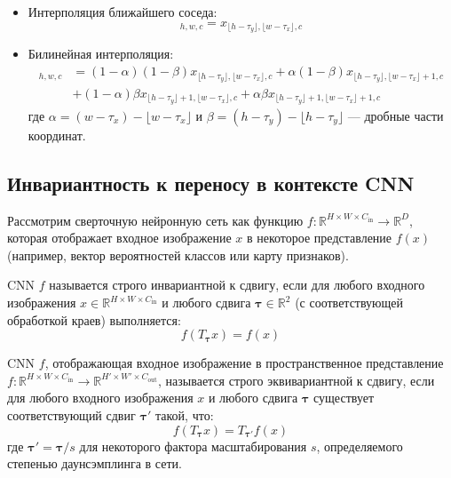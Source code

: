 \begin{itemize}
    \item Интерполяция ближайшего соседа:
    \begin{equation}
    [T_{\boldsymbol{\tau}}x]_{h,w,c} = x_{\lfloor h-\tau_y \rfloor, \lfloor w-\tau_x \rfloor, c}
    \end{equation}
    
    \item Билинейная интерполяция:
    \begin{align}
    [T_{\boldsymbol{\tau}}x]_{h,w,c} &= (1-\alpha)(1-\beta)x_{\lfloor h-\tau_y \rfloor, \lfloor w-\tau_x \rfloor, c} + \alpha(1-\beta)x_{\lfloor h-\tau_y \rfloor, \lfloor w-\tau_x \rfloor+1, c} \nonumber \\
    &+ (1-\alpha)\beta x_{\lfloor h-\tau_y \rfloor+1, \lfloor w-\tau_x \rfloor, c} + \alpha\beta x_{\lfloor h-\tau_y \rfloor+1, \lfloor w-\tau_x \rfloor+1, c}
    \end{align}
    где $\alpha = (w-\tau_x) - \lfloor w-\tau_x \rfloor$ и $\beta = (h-\tau_y) - \lfloor h-\tau_y \rfloor$ — дробные части координат.
\end{itemize}

\subsection{Инвариантность к переносу в контексте CNN}
\label{theory:formal_definition:cnn_context}

Рассмотрим сверточную нейронную сеть как функцию $f: \mathbb{R}^{H \times W \times C_{\text{in}}} \rightarrow \mathbb{R}^{D}$, которая отображает входное изображение $x$ в некоторое представление $f(x)$ (например, вектор вероятностей классов или карту признаков).

\begin{definition}
CNN $f$ называется строго инвариантной к сдвигу, если для любого входного изображения $x \in \mathbb{R}^{H \times W \times C_{\text{in}}}$ и любого сдвига $\boldsymbol{\tau} \in \mathbb{R}^2$ (с соответствующей обработкой краев) выполняется:
\begin{equation}
f(T_{\boldsymbol{\tau}}x) = f(x)
\end{equation}
\end{definition}

\begin{definition}
CNN $f$, отображающая входное изображение в пространственное представление $f: \mathbb{R}^{H \times W \times C_{\text{in}}} \rightarrow \mathbb{R}^{H' \times W' \times C_{\text{out}}}$, называется строго эквивариантной к сдвигу, если для любого входного изображения $x$ и любого сдвига $\boldsymbol{\tau}$ существует соответствующий сдвиг $\boldsymbol{\tau}'$ такой, что:
\begin{equation}
f(T_{\boldsymbol{\tau}}x) = T_{\boldsymbol{\tau}'}f(x)
\end{equation}
где $\boldsymbol{\tau}' = \boldsymbol{\tau} / s$ для некоторого фактора масштабирования $s$, определяемого степенью даунсэмплинга в сети.
\end{definition}

